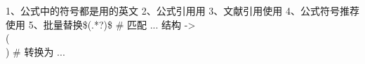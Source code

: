 1、公式中的符号都是用的英文
2、公式引用用%
3、文献引用使用%
4、公式符号推荐使用%
5、批量替换\$(.*?)\$   # 匹配 $...$ 结构 -> \\(\1\\)    # 转换为 \(...\)

